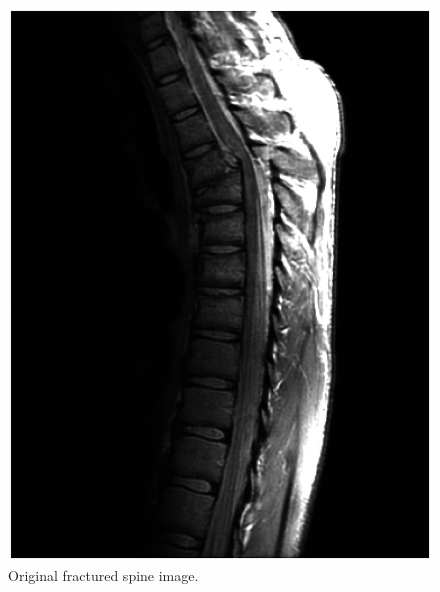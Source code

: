 \begin{figure}[!Htb]
  \centering
  \includegraphics[width=\textwidth]{fracturedSpineOriginal.eps}
  \caption{Original fractured spine image.}
  \label{fig:fractured_spine_original}
\end{figure}

